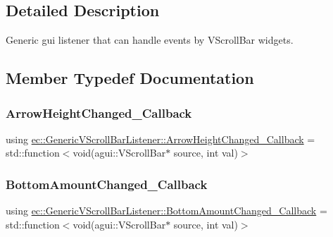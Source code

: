 \subsection{Detailed Description}
Generic gui listener that can handle events by V\+Scroll\+Bar widgets. 

\subsection{Member Typedef Documentation}
\mbox{\label{classec_1_1_generic_v_scroll_bar_listener_ac1f858278a1e02d55a109fcf9939932c}} 
\subsubsection{\texorpdfstring{Arrow\+Height\+Changed\+\_\+\+Callback}{ArrowHeightChanged\_Callback}}
{\footnotesize\ttfamily using \mbox{\hyperlink{classec_1_1_generic_v_scroll_bar_listener_ac1f858278a1e02d55a109fcf9939932c}{ec\+::\+Generic\+V\+Scroll\+Bar\+Listener\+::\+Arrow\+Height\+Changed\+\_\+\+Callback}} =  std\+::function$<$void(agui\+::\+V\+Scroll\+Bar$\ast$ source, int val)$>$}

\mbox{\label{classec_1_1_generic_v_scroll_bar_listener_abcc4e00e4c23a24981d7fc0a7538d00f}} 
\subsubsection{\texorpdfstring{Bottom\+Amount\+Changed\+\_\+\+Callback}{BottomAmountChanged\_Callback}}
{\footnotesize\ttfamily using \mbox{\hyperlink{classec_1_1_generic_v_scroll_bar_listener_abcc4e00e4c23a24981d7fc0a7538d00f}{ec\+::\+Generic\+V\+Scroll\+Bar\+Listener\+::\+Bottom\+Amount\+Changed\+\_\+\+Callback}} =  std\+::function$<$void(agui\+::\+V\+Scroll\+Bar$\ast$ source, int val)$>$}

